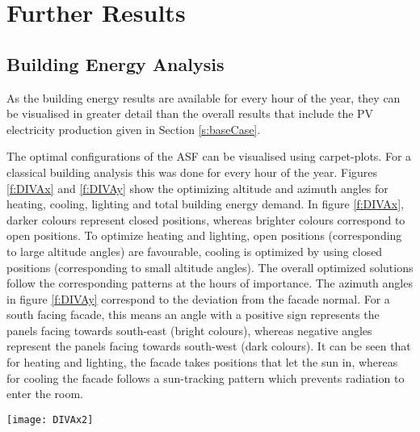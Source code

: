 
\chapter{Further Results}\label{furtherResults}

\section{Building Energy Analysis}
\label{s:buildingResults}
	
	As the building energy results are available for every hour of the year, they can be visualised in greater detail than the overall results that include the PV electricity production given in Section \ref{s:baseCase}. 

	The optimal configurations of the ASF can be visualised using carpet-plots. For a classical building analysis this was done for every hour of the year. Figures \ref{f:DIVAx} and \ref{f:DIVAy} show the optimizing altitude and azimuth angles for heating, cooling, lighting and total building energy demand. In figure \ref{f:DIVAx}, darker colours represent closed positions, whereas brighter colours correspond to open positions. To optimize heating and lighting, open positions (corresponding to large altitude angles) are favourable, cooling is optimized by using closed positions (corresponding to small altitude angles). The overall optimized solutions follow the corresponding patterns at the hours of importance. The azimuth angles in figure \ref{f:DIVAy} correspond to the deviation from the facade normal. For a south facing facade, this means an angle with a positive sign represents the panels facing towards south-east (bright colours), whereas negative angles represent the panels facing towards south-west (dark colours). It can be seen that for heating and lighting, the facade takes positions that let the sun in, whereas for cooling the facade follows a sun-tracking pattern which prevents radiation to enter the room. 

	\begin{figure*}
		\begin{center}
		\texttt{[image: DIVAx2]}
		\caption{Carpet plots detailing the optimal altitude angles to minimise the (a) heating demand, (b) cooling demand, (c) lighting demand, and (d) total building energy demand. Darker colours represent closed positions, whereas brighter colors correspond to open positions. To optimize heating and lighting, open positions are favorable, cooling is optimized by using closed positions.}
		\label{f:DIVAx}
		\end{center}
	\end{figure*}


